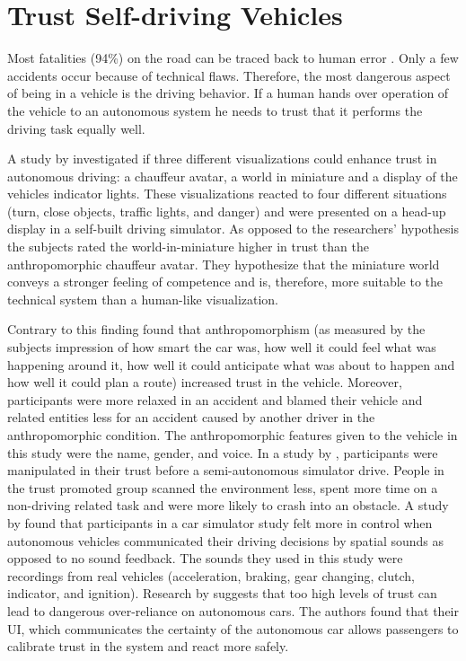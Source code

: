 \section{Trust Self-driving Vehicles}\label{sec:trust}
Most fatalities (94\%) on the road can be traced back to human error \citep[see][]{Singh2015CriticalSurvey}. Only a few accidents occur because of technical flaws. Therefore, the most dangerous aspect of being in a vehicle is the driving behavior. If a human hands over operation of the vehicle to an autonomous system he needs to trust that it performs the driving task equally well. 

A study by \citet{Hauslschmid2017} investigated if three different visualizations could enhance trust in autonomous driving: a chauffeur avatar, a world in miniature and a display of the vehicles indicator lights. These visualizations reacted to four different situations (turn, close objects, traffic lights, and danger) and were presented on a head-up display in a self-built driving simulator. As opposed to the researchers' hypothesis the subjects rated the world-in-miniature higher in trust than the anthropomorphic chauffeur avatar. They hypothesize that the miniature world conveys a stronger feeling of competence and is, therefore, more suitable to the technical system than a human-like visualization.

Contrary to this finding \citet{Waytz2014} found that anthropomorphism (as measured by the subjects impression of how smart the car was, how well it could feel what was happening around it, how well it could anticipate what was about to happen and how well it could plan a route) increased trust in the vehicle. Moreover, participants were more relaxed in an accident and blamed their vehicle and related entities less for an accident caused by another driver in the anthropomorphic condition. The anthropomorphic features given to the vehicle in this study were the name, gender, and voice. 
In a study by \cite{Korber2018}, participants were manipulated in their trust before a semi-autonomous simulator drive. People in the trust promoted group scanned the environment less, spent more time on a non-driving related task and were more likely to crash into an obstacle. 
A study by \citet{Beattie} found that participants in a car simulator study felt more in control when autonomous vehicles communicated their driving decisions by spatial sounds as opposed to no sound feedback. The sounds they used in this study were recordings from real vehicles (acceleration, braking, gear changing, clutch, indicator, and ignition). Research by \citet{Helldin2013PresentingDriving} suggests that too high levels of trust can lead to dangerous over-reliance on autonomous cars. The authors found that their UI, which communicates the certainty of the autonomous car allows passengers to calibrate trust in the system and react more safely. 

